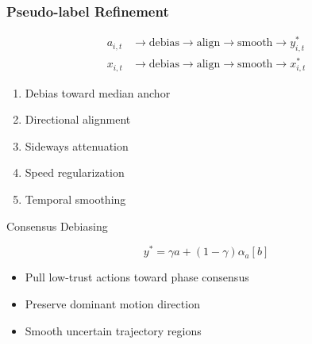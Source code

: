 \documentclass{beamer}
\begin{document}
\begin{frame}
    \frametitle{\textbf{Pseudo-label Refinement}}

    \centering
    \vspace{-2em}
    \[
        \begin{aligned}
            a_{i,t}
            &
            \rightarrow
            \text{debias}
            \rightarrow
            \text{align}
            \rightarrow
            \text{smooth}
            \rightarrow
            y^*_{i,t}
            \\
            x_{i,t}
            &
            \rightarrow
            \text{debias}
            \rightarrow
            \text{align}
            \rightarrow
            \text{smooth}
            \rightarrow
            x^*_{i,t}
        \end{aligned}
    \]

    \vspace{-0.5em}
    \begin{enumerate}
        \item Debias toward median anchor
        \item Directional alignment
        \item Sideways attenuation
        \item Speed regularization
        \item Temporal smoothing
    \end{enumerate}

    \begin{block}{Consensus Debiasing}

        \[
            y^*
            =
            \gamma a
            +
            (1-\gamma)\alpha_a[b]
        \]

    \end{block}

    \vspace{1em}

    \begin{itemize}
        \item Pull low-trust actions toward phase consensus
        \item Preserve dominant motion direction
        \item Smooth uncertain trajectory regions
    \end{itemize}

\end{frame}
\end{document}

